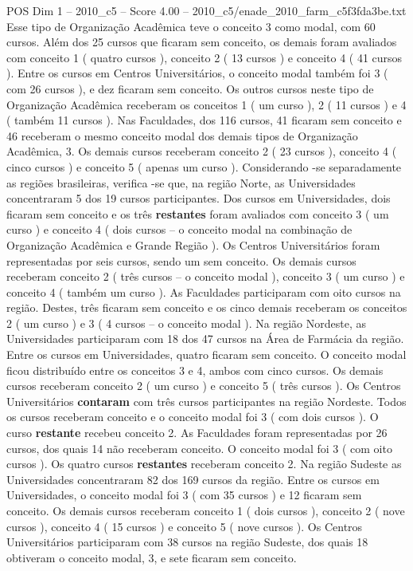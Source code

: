 \begin{textsample}{POS Dim 1 – 2010\_c5 – Score 4.00 – 2010\_c5/enade\_2010\_farm\_c5f3fda3be.txt}
Esse tipo de Organização Acadêmica teve o conceito 3 como modal, com 60 cursos.
Além dos 25 cursos que ficaram sem conceito, os demais foram avaliados com conceito 1 ( quatro cursos ), conceito 2 ( 13 cursos ) e conceito 4 ( 41 cursos ).
Entre os cursos em Centros Universitários, o conceito modal também foi 3 ( com 26 cursos ), e dez ficaram sem conceito.
Os outros cursos neste tipo de Organização Acadêmica receberam os conceitos 1 ( um curso ), 2 ( 11 cursos ) e 4 ( também 11 cursos ).
Nas Faculdades, dos 116 cursos, 41 ficaram sem conceito e 46 receberam o mesmo conceito modal dos demais tipos de Organização Acadêmica, 3.
Os demais cursos receberam conceito 2 ( 23 cursos ), conceito 4 ( cinco cursos ) e conceito 5 ( apenas um curso ).
Considerando -se separadamente as regiões brasileiras, verifica -se que, na região Norte, as Universidades concentraram 5 dos 19 cursos participantes.
Dos cursos em Universidades, dois ficaram sem conceito e os três \textbf{restantes} foram avaliados com conceito 3 ( um curso ) e conceito 4 ( dois cursos – o conceito modal na combinação de Organização Acadêmica e Grande Região ).
Os Centros Universitários foram representadas por seis cursos, sendo um sem conceito.
Os demais cursos receberam conceito 2 ( três cursos – o conceito modal ), conceito 3 ( um curso ) e conceito 4 ( também um curso ).
As Faculdades participaram com oito cursos na região.
Destes, três ficaram sem conceito e os cinco demais receberam os conceitos 2 ( um curso ) e 3 ( 4 cursos – o conceito modal ).
Na região Nordeste, as Universidades participaram com 18 dos 47 cursos na Área de Farmácia da região.
Entre os cursos em Universidades, quatro ficaram sem conceito.
O conceito modal ficou distribuído entre os conceitos 3 e 4, ambos com cinco cursos.
Os demais cursos receberam conceito 2 ( um curso ) e conceito 5 ( três cursos ).
Os Centros Universitários \textbf{contaram} com três cursos participantes na região Nordeste.
Todos os cursos receberam conceito e o conceito modal foi 3 ( com dois cursos ).
O curso \textbf{restante} recebeu conceito 2.
As Faculdades foram representadas por 26 cursos, dos quais 14 não receberam conceito.
O conceito modal foi 3 ( com oito cursos ).
Os quatro cursos \textbf{restantes} receberam conceito 2.
Na região Sudeste as Universidades concentraram 82 dos 169 cursos da região.
Entre os cursos em Universidades, o conceito modal foi 3 ( com 35 cursos ) e 12 ficaram sem conceito.
Os demais cursos receberam conceito 1 ( dois cursos ), conceito 2 ( nove cursos ), conceito 4 ( 15 cursos ) e conceito 5 ( nove cursos ).
Os Centros Universitários participaram com 38 cursos na região Sudeste, dos quais 18 obtiveram o conceito modal, 3, e sete ficaram sem conceito.

\end{textsample}
